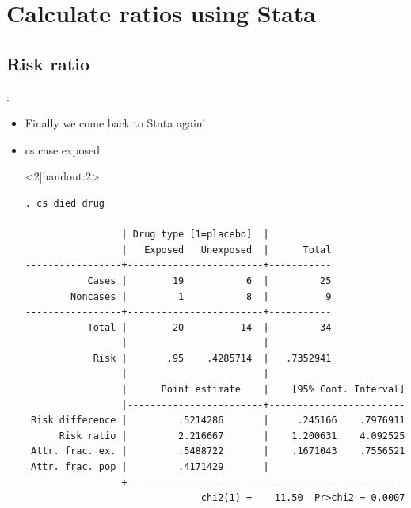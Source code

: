 \section{Calculate ratios using Stata}
\subsection{Risk ratio}
\begin{frame}[fragile]{\secname: \subsecname}	
\begin{itemize}
\item Finally we come back to Stata again!
\item<2|handout:2> cs case exposed
\item[]<2|handout:2>\scriptsize \begin{verbatim}
. cs died drug

                 | Drug type [1=placebo]  |
                 |   Exposed   Unexposed  |      Total
-----------------+------------------------+-----------
           Cases |        19           6  |         25
        Noncases |         1           8  |          9
-----------------+------------------------+-----------
           Total |        20          14  |         34
                 |                        |
            Risk |       .95    .4285714  |   .7352941
                 |                        |
                 |      Point estimate    |    [95% Conf. Interval]
                 |------------------------+------------------------
 Risk difference |         .5214286       |     .245166    .7976911 
      Risk ratio |         2.216667       |    1.200631    4.092525 
 Attr. frac. ex. |         .5488722       |    .1671043    .7556521 
 Attr. frac. pop |         .4171429       |
                 +-------------------------------------------------
                               chi2(1) =    11.50  Pr>chi2 = 0.0007	
\end{verbatim}
\end{itemize}
\end{frame}

